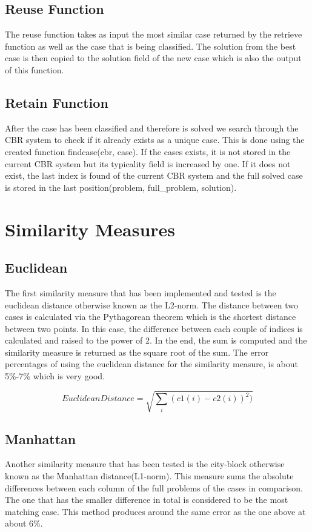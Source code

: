 \documentclass[a4paper,11pt]{article}
\begin{document}
\subsection{Reuse  Function}
The reuse function takes as input the most similar case returned by the
retrieve function as well as the case that is being classified. The solution
from the best case is then copied to the solution field of the new case which
is also the output of this function.

\subsection{Retain  Function}
After the case has been classified and therefore is solved we search through
the CBR system to check if it already exists as a unique case. This is done
using the created function findcase(cbr, case). If the cases exists, it is not
stored in the current CBR system but its typicality field is increased by one.
If it does not exist, the last index is found of the current CBR system and the
full solved case is stored in the last position(problem, full\_problem,
solution).

\section{Similarity Measures}

\subsection{Euclidean}
The first similarity measure that has been implemented and tested is the
euclidean distance otherwise known as the L2-norm. The distance between two
cases is calculated via the Pythagorean theorem which is the shortest distance
between two points. In this case, the difference between each couple of indices
is calculated and raised to the power of 2. In the end, the sum is computed and
the similarity measure is returned as the square root of the sum. The error
percentages of using the euclidean distance for the similarity measure, is
about 5\%-7\% which is very good. 

\begin{equation}
Euclidean Distance = \sqrt{\sum_i (c1(i) - c2(i))^{2})}
\end{equation}

\subsection{Manhattan}
Another similarity measure that has been tested is the city-block otherwise
known as the Manhattan distance(L1-norm). This measure sums the absolute
differences between each column of the full problems of the cases in
comparison. The one that has the smaller difference in total is considered to
be the most matching case. This method produces around the same error as the
one above at about 6\%.
\end{document}
